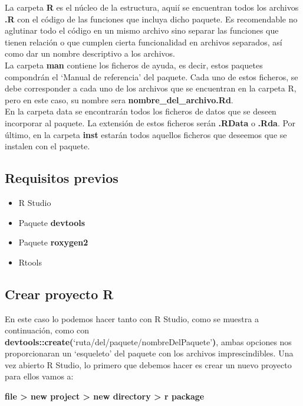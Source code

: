 La carpeta \textbf{R} es el n\'ucleo de la estructura, aqui\'i se encuentran todos los archivos \textbf{\textbf{.R}} con el c\'odigo de las funciones que incluya dicho paquete.
Es recomendable no aglutinar todo el c\'odigo en un mismo archivo sino separar las funciones que tienen relaci\'on 
o que cumplen cierta funcionalidad en archivos separados, as\'i como dar un nombre descriptivo a los archivos.\\

La carpeta \textbf{man} contiene los ficheros de ayuda, es decir, estos paquetes compondr\'an el \enquote*{Manual de referencia} 
del paquete. Cada uno de estos ficheros, se debe corresponder a cada uno de los archivos que se encuentran 
en la carpeta R, pero en este caso, su nombre sera \textbf{nombre\_del\_archivo\textbf{.R}d}.\\

En la carpeta data se encontrar\'an todos los ficheros de datos que se deseen incorporar al paquete. La extensi\'on 
de estos ficheros ser\'an \textbf{\textbf{.R}Data} o \textbf{\textbf{.R}da}.
Por \'ultimo, en la carpeta \textbf{inst} estar\'an todos aquellos ficheros que deseemos que se instalen con el paquete.


\subsection{Requisitos previos}

\begin{itemize}
    \item R Studio
    \item Paquete \textbf{devtools}
    \item Paquete \textbf{\textbf{roxygen2}} 
    \item Rtools
\end{itemize}

\subsection{Crear proyecto R}

En este caso lo podemos hacer tanto con R Studio, como se muestra a continuaci\'on,
como con \textbf{devtools::create(}\enquote*{ruta/del/paquete/nombreDelPaquete}\textbf{)}, ambas opciones nos
proporcionaran un \enquote*{esqueleto} del paquete con los archivos imprescindibles.
Una vez abierto R Studio, lo primero que debemos hacer es crear un nuevo proyecto para
ellos vamos a: 
\begin{center}
    \textbf{file > new project > new directory > r package} 
\end{center}

